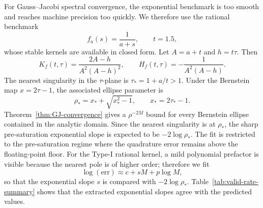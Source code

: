 For Gauss--Jacobi spectral convergence, the exponential benchmark is too smooth and reaches machine precision too quickly.  We therefore use the rational benchmark
\begin{equation}
    f_a(s)=\frac{1}{a+s},\qquad t=1.5,
    \label{eq:valid-rational-benchmark}
\end{equation}
whose stable kernels are available in closed form.  Let $A=a+t$ and $h=t\tau$.  Then
\begin{equation}
    K_f(t,\tau)=\frac{2A-h}{A^2(A-h)^2},
    \qquad
    H_f(t,\tau)=-\frac{1}{A^2(A-h)}.
\end{equation}
The nearest singularity in the $\tau$-plane is $\tau_*=1+a/t>1$.  Under the Bernstein map $x=2\tau-1$, the associated ellipse parameter is
\begin{equation}
    \rho_*=x_*+\sqrt{x_*^2-1},
    \qquad x_*=2\tau_*-1.
\end{equation}
Theorem~\ref{thm:GJ-convergence} gives a $\rho^{-2M}$ bound for every Bernstein ellipse contained in the analytic domain.  Since the nearest singularity is at $\rho_*$, the sharp pre-saturation exponential slope is expected to be $-2\log\rho_*$.  The fit is restricted to the pre-saturation regime where the quadrature error remains above the floating-point floor.  For the Type-I rational kernel, a mild polynomial prefactor is visible because the nearest pole is of higher order; therefore we fit
\begin{equation}
    \log(\mathrm{err})\approx c+sM+p\log M,
\end{equation}
so that the exponential slope $s$ is compared with $-2\log\rho_*$.  Table~\ref{tab:valid-rate-summary} shows that the extracted exponential slopes agree with the predicted values.


